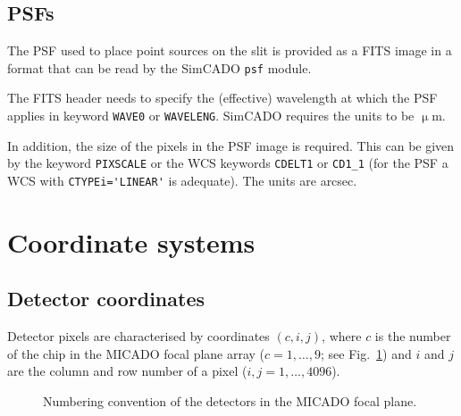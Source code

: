 \documentclass[a4paper,twoside,11pt]{article}
\newcommand{\micron}{\upmu\mathrm{m}}
\begin{document}
\subsection{PSFs}
\label{ssec:input_psf}

The PSF used to place point sources on the slit is provided as a FITS
image in a format that can be read by the SimCADO \lstinline{psf}
module.

The FITS header needs to specify the (effective) wavelength at which
the PSF applies in keyword \lstinline{WAVE0} or
\lstinline{WAVELENG}. SimCADO requires the units to be $\micron$.

In addition, the size of the pixels in the PSF image is required. This
can be given by the keyword \lstinline{PIXSCALE} or the WCS keywords
\lstinline{CDELT1} or \lstinline{CD1_1} (for the PSF a WCS with
\lstinline{CTYPEi='LINEAR'} is adequate). The units are arcsec.


\section{Coordinate systems}
\label{sec:coordinates}

\subsection{Detector coordinates}

Detector pixels are characterised by coordinates $(c, i, j)$, where
$c$ is the number of the chip in the MICADO focal plane array
($c=1,\dots,9$; see Fig.~\ref{fig:detector_layout}) and $i$ and $j$
are the column and row number of a pixel ($i, j = 1,\dots,4096$).

\begin{figure}[b]
  \centering
  \caption{Numbering convention of the detectors in the MICADO focal
    plane.}
  \label{fig:detector_layout}
\end{figure}
\end{document}
